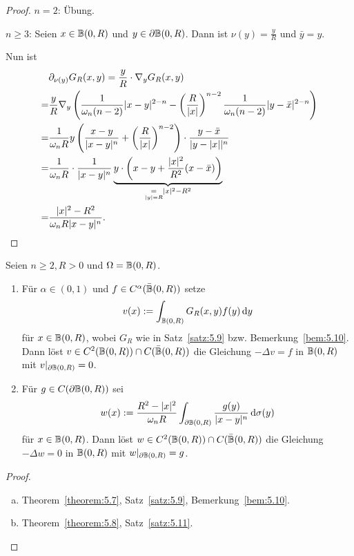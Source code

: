 \begin{proof}
  $n=2$: Übung.

  $n\geq3$: Seien $x\in\mathbb{B}(0,R)$ und $y\in\partial\mathbb{B}(0,R)$. Dann ist $\nu(y)=\frac yR$ und $\bar y=y$.

  Nun ist
  \[
  \begin{split}
  &  \partial_{\nu(y)}G_R(x,y)=\frac yR\cdot\nabla_yG_R(x,y) \\
    =&\frac yR\nabla_y\left(
      \frac 1{\omega_n(n-2)}\lvert x-y\rvert^{2-n}-\left(
        \frac R{\lvert x\rvert}
      \right)^{n-2}
      \frac 1{\omega_n(n-2)}\lvert y-\bar x\rvert^{2-n}
    \right) \\
    =&\frac 1{\omega_nR}y\left(
      \frac{x-y}{\lvert x-y\rvert^n}+\left(
        \frac R{\lvert x\rvert}
      \right)^{n-2}
    \right)
    \cdot \frac{y-\bar x}{\lvert y-\lvert x\rvert\rvert^n} \\
    =&\frac 1{\omega_nR}\cdot\frac 1{\lvert x-y\rvert^n}\underbrace{y\cdot\left(
        x-y+\frac{\lvert x\rvert^2}{R^2}(x-\bar x)
      \right)}_{\underset{\lvert y\rvert=R}=\lvert x\rvert^2-R^2} \\
    =&\frac{\lvert x\rvert^2-R^2}{\omega_nR\lvert x-y\rvert^n}. \qedhere
  \end{split}
  \]
\end{proof}

\begin{theorem}[Laplace-Dirichlet-Problem auf $\Omega=\B(0,R)$]
  \label{theorem:5.12} Seien $n\geq2, R>0$ und $\Omega=\B(0,R)$.
  \begin{enumerate}[\rm (a)]
  \item Für $\alpha\in(0,1)$ und $f\in C^\alpha(\bar{\mathbb{B}}(0,R))$ setze
    \[ v(x):=\int_{\mathbb{B}(0,R)}G_R(x,y)f(y)\,\mathrm{d} y \]
    für $x\in\mathbb{B}(0,R)$, wobei $G_R$ wie in Satz~\ref{satz:5.9} bzw. Bemerkung~\ref{bem:5.10}. Dann löst $v\in C^2(\mathbb{B}(0,R))\cap C(\bar{\mathbb{B}}(0,R))$ die Gleichung $-\Delta v=f$ in $\mathbb{B}(0,R)$ mit $v\rvert_{\partial\mathbb{B}(0,R)}=0$.
  \item Für $g\in C(\partial\mathbb{B}(0,R))$ sei
    \[ w(x):=\frac{R^2-\lvert x\rvert^2}{\omega_nR}\int_{\partial\mathbb{B}(0,R)}\frac{g(y)}{\lvert x-y\rvert^n}\,\mathrm{d} \sigma(y) \]
      für $x\in\mathbb{B}(0,R)$. Dann löst $w\in C^2(\mathbb{B}(0,R))\cap C(\bar{\mathbb{B}}(0,R))$ die Gleichung $-\Delta w=0$ in $\mathbb{B}(0,R)$ mit $w\rvert_{\partial\mathbb{B}(0,R)}=g$.
  \end{enumerate}  
\end{theorem}

\begin{proof}
  \begin{enumerate}[(a)]
  \item Theorem~\ref{theorem:5.7}, Satz~\ref{satz:5.9}, Bemerkung~\ref{bem:5.10}.
  \item Theorem~\ref{theorem:5.8}, Satz~\ref{satz:5.11}.\qedhere
  \end{enumerate}
\end{proof}

